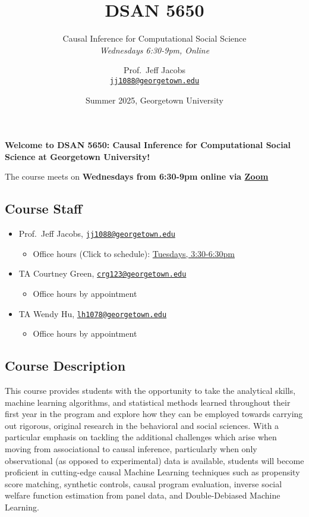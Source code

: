 \documentclass[
]{scrartcl}
\title{DSAN 5650}
\subtitle{Causal Inference for Computational Social
Science \\ \textit{Wednesdays 6:30-9pm, Online}}
\author{Prof.~Jeff
Jacobs \\[-0.2em] \normalsize{\href{mailto:jj1088@georgetown.edu}{\texttt{jj1088@georgetown.edu}}}}
\date{\normalsize{Summer 2025, Georgetown University}}
\providecommand{\tightlist}{%
  \setlength{\itemsep}{0pt}\setlength{\parskip}{0pt}}\usepackage{longtable,booktabs,array}
\begin{document}
\maketitle


\textbf{Welcome to DSAN 5650: Causal Inference for Computational Social
Science at Georgetown University!}

The course meets on \textbf{Wednesdays from 6:30-9pm online via
\href{https://maps.app.goo.gl/fVVfDFpp4MEuukXa9}{Zoom}}

\subsection{Course Staff}\label{course-staff}

\begin{itemize}
\tightlist
\item
  Prof.~Jeff Jacobs,
  \href{mailto:jj1088@georgetown.edu}{\texttt{jj1088@georgetown.edu}}

  \begin{itemize}
  \tightlist
  \item
    Office hours (Click to schedule):
    \href{https://jjacobs.me/meet}{Tuesdays, 3:30-6:30pm}
  \end{itemize}
\item
  TA Courtney Green,
  \href{mailto:crg123@georgetown.edu}{\texttt{crg123@georgetown.edu}}

  \begin{itemize}
  \tightlist
  \item
    Office hours by appointment
  \end{itemize}
\item
  TA Wendy Hu,
  \href{mailto:lh1078@georgetown.edu}{\texttt{lh1078@georgetown.edu}}

  \begin{itemize}
  \tightlist
  \item
    Office hours by appointment
  \end{itemize}
\end{itemize}

\subsection{Course Description}\label{course-description}

This course provides students with the opportunity to take the
analytical skills, machine learning algorithms, and statistical methods
learned throughout their first year in the program and explore how they
can be employed towards carrying out rigorous, original research in the
behavioral and social sciences. With a particular emphasis on tackling
the additional challenges which arise when moving from associational to
causal inference, particularly when only observational (as opposed to
experimental) data is available, students will become proficient in
cutting-edge causal Machine Learning techniques such as propensity score
matching, synthetic controls, causal program evaluation, inverse social
welfare function estimation from panel data, and Double-Debiased Machine
Learning.
\end{document}
